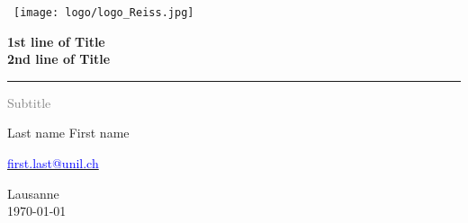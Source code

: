 
\begin{titlepage}
\begin{singlespace}

\begin{center}
\hbox{\hspace{-3cm} \texttt{[image: logo/logo\_Reiss.jpg]}}
\end{center}
\vspace*{1cm}

\Huge %
\textbf{1st line of Title\\ 2nd line of Title}\\
\rule{5cm}{0.2pt}

\LARGE
\textcolor{gray}{
Subtitle\\
}
\vspace{2cm}

Last name First name

\large

\href{mailto:first.last@unil.ch}{\textcolor{blue}{first.last@unil.ch}}

\vfill


Lausanne\\
\today

\end{singlespace}
\end{titlepage}
\restoregeometry